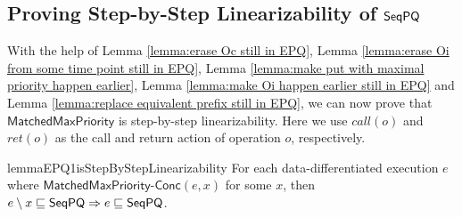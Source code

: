 \subsection{Proving Step-by-Step Linearizability of $\mathsf{SeqPQ}$}
\label{sec:obtaining new sequences while ensureing that they are in SeqPQ}


With the help of Lemma \ref{lemma:erase Oc still in EPQ}, Lemma \ref{lemma:erase Oi from some time point still in EPQ}, Lemma \ref{lemma:make put with maximal priority happen earlier}, Lemma \ref{lemma:make Oi happen earlier still in EPQ} and Lemma \ref{lemma:replace equivalent prefix still in EPQ}, we can now prove that $\mathsf{MatchedMaxPriority}$ is step-by-step linearizability. Here we use $\textit{call}(o)$ and $\textit{ret}(o)$ as the call and return action of operation $o$, respectively.

\begin{restatable}{lemma}{EPQ1isStepByStepLinearizability}
\label{lemma:EPQ1 is step-by-step linearizability}
For each data-differentiated execution $e$ where $\mathsf{MatchedMaxPriority}\mathsf{\text{-}Conc}(e,x)$ for some $x$, then $e \setminus x \sqsubseteq \mathsf{SeqPQ} \Rightarrow e \sqsubseteq \mathsf{SeqPQ}$.
\end{restatable}

